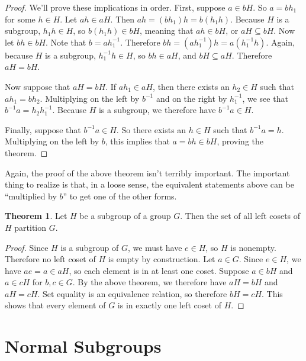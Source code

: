 \documentclass[12pt]{article}
\newcommand{\inv}[1]{#1^{-1}}
\theoremstyle{definition}
\newtheorem{theorem}{Theorem}[section]
\newenvironment{thm}
{\theoremstyle{definition}
\begin{theorem}}
{\end{theorem}}
\begin{document}
\begin{proof}

We'll prove these implications in order. First, suppose $a \in bH$. So $a = bh_1$ for some $h \in H$. Let $ah \in aH$. Then $ah = (bh_1)h = b(h_1 h)$. Because $H$ is a subgroup, $h_1 h \in H$, so $b(h_1 h) \in bH$, meaning that $ah \in bH$, or $aH \subseteq bH$. Now let $bh \in bH$. Note that $b = a \inv{h_1}$. Therefore $bh = (a \inv{h_1})h = a (\inv{h_1}h)$. Again, because $H$ is a subgroup, $\inv{h_1} h \in H$, so $bh \in aH$, and $bH \subseteq aH$. Therefore $aH = bH$.

Now suppose that $aH = bH$. If $ah_1 \in aH$, then there exists an $h_2 \in H$ such that $ah_1 = bh_2$. Multiplying on the left by $\inv{b}$ and on the right by $\inv{h_1}$, we see that $\inv{b}a = h_2 \inv{h_1}$. Because $H$ is a subgroup, we therefore have $\inv{b}a \in H$.

Finally, suppose that $\inv{b}a \in H$. So there exists an $h \in H$ such that $\inv{b}a = h$. Multiplying on the left by $b$, this implies that $a = bh \in bH$, proving the theorem.

\end{proof}

Again, the proof of the above theorem isn't terribly important. The important thing to realize is that, in a loose sense, the equivalent statements above can be ``multiplied by $b$'' to get one of the other forms.

\begin{thm}
Let $H$ be a subgroup of a group $G$. Then the set of all left cosets of $H$ partition $G$.
\end{thm}

\begin{proof}
Since $H$ is a subgroup of $G$, we must have $e \in H$, so $H$ is nonempty. Therefore no left coset of $H$ is empty by construction. Let $a \in G$. Since $e \in H$, we have $ae = a \in aH$, so each element is in at least one coset. Suppose $a \in bH$ and $a \in cH$ for $b, c \in G$. By the above theorem, we therefore have $aH = bH$ and $aH = cH$. Set equality is an equivalence relation, so therefore $bH = cH$. This shows that every element of $G$ is in exactly one left coset of $H$.

\end{proof}


\section{Normal Subgroups}
\end{document}
